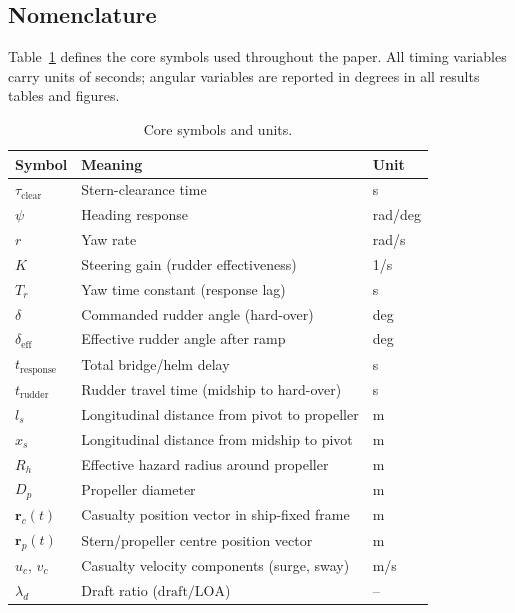 \documentclass[preprint,12pt]{elsarticle}
\begin{document}
\subsection{Nomenclature}
Table~\ref{tab:nomenclature} defines the core symbols used throughout the paper. All timing variables carry units of seconds; angular variables are reported in degrees in all results tables and figures.
\begin{table}[H]
\centering
\caption{Core symbols and units.}
\label{tab:nomenclature}
\begin{tabular}{lll}
\toprule
Symbol & Meaning & Unit \\
\midrule
$\tau_{\mathrm{clear}}$ & Stern-clearance time & s \\
$\psi$ & Heading response & rad/deg \\
$r$ & Yaw rate & rad/s \\
$K$ & Steering gain (rudder effectiveness) & 1/s \\
$T_r$ & Yaw time constant (response lag) & s \\
$\delta$ & Commanded rudder angle (hard-over) & deg \\
$\delta_{\mathrm{eff}}$ & Effective rudder angle after ramp & deg \\
$t_{\mathrm{response}}$ & Total bridge/helm delay & s \\
$t_{\mathrm{rudder}}$ & Rudder travel time (midship to hard-over) & s \\
$l_s$ & Longitudinal distance from pivot to propeller & m \\
$x_s$ & Longitudinal distance from midship to pivot & m \\
$R_h$ & Effective hazard radius around propeller & m \\
$D_p$ & Propeller diameter & m \\
$\mathbf{r}_c(t)$ & Casualty position vector in ship-fixed frame & m \\
$\mathbf{r}_p(t)$ & Stern/propeller centre position vector & m \\
$u_c,\,v_c$ & Casualty velocity components (surge, sway) & m/s \\
$\lambda_d$ & Draft ratio ($\text{draft}/\text{LOA}$) & -- \\
\bottomrule
\end{tabular}
\end{table}
\end{document}
